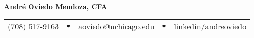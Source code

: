 \documentclass{article}
\begin{document}
    \fontsize{9}{15}
    \selectfont
    \begin{center}
        \begin{center}
            \huge\bfseries André Oviedo Mendoza, CFA
        \end{center}
            \begin{tabular}{c c c c c}
                \href{tel:(708)517-9163}{(708) 517-9163}  & $\bullet$ &
                \href{mailto:aoviedo@uchicago.edu}{aoviedo@uchicago.edu}  & $\bullet$ & 
                \href{https://www.linkedin.com/in/andreoviedo/}{linkedin/andreoviedo} \\
        \end{tabular}
    \end{center}    
    \vspace{-0.75em}
    
    
    

    
    
    
  
\end{document}
